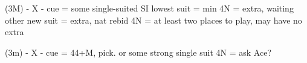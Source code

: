(3M) - X -
cue = some single-suited SI
    lowest suit = min
    4N = extra, waiting
    other new suit = extra, nat rebid
4N = at least two places to play, may have no extra

(3m) - X -
cue = 44+M, pick. or some strong single suit
4N = ask Ace?